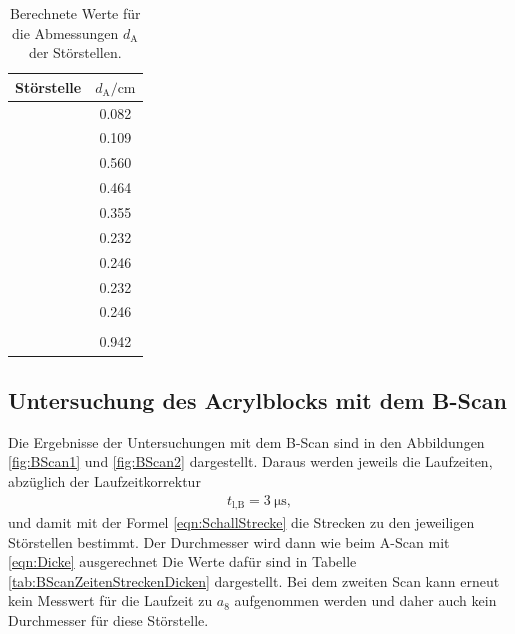 \begin{table}[h]
  \centering
  \begin{tabular}{S S}
    \toprule
    {Störstelle} & {$d_\text{A}/\si{\centi\meter}$} \\
    \midrule
     & 0.082 \\
     & 0.109 \\
     & 0.560 \\
     & 0.464 \\
     & 0.355 \\
     & 0.232 \\
     & 0.246 \\
     & 0.232 \\
     & 0.246 \\
     & \text{ } \\
     & 0.942 \\
    \bottomrule
  \end{tabular}
  \caption{Berechnete Werte für die Abmessungen $d_\text{A}$ der Störstellen.}
  \label{tab:AScanDicken}
\end{table}

\subsection{Untersuchung des Acrylblocks mit dem B-Scan}

Die Ergebnisse der Untersuchungen mit dem B-Scan sind in den Abbildungen
\ref{fig:BScan1} und \ref{fig:BScan2} dargestellt.
Daraus werden jeweils die Laufzeiten, abzüglich der Laufzeitkorrektur
\begin{align}
  t_\text{l,B} = \SI{3}{\micro\second},
\end{align}
und damit mit der Formel
\ref{eqn:SchallStrecke} die Strecken zu den
jeweiligen Störstellen bestimmt. Der Durchmesser wird dann wie beim A-Scan mit
\eqref{eqn:Dicke} ausgerechnet
Die Werte dafür sind in Tabelle \ref{tab:BScanZeitenStreckenDicken}
dargestellt. Bei dem zweiten Scan kann erneut kein Messwert für die Laufzeit
zu $a_8$ aufgenommen werden und daher auch kein Durchmesser für diese
Störstelle.

